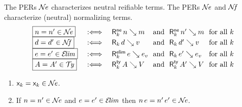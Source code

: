 \documentclass[acmlarge,review,anonymous]{acmart}\settopmatter{printfolios=true}
\begin{document}
The PERs $\mathcal{N}\!\mathit{e}$ characterizes neutral reifiable terms.
The PERs $\mathcal{N}\!\mathit{e}$ and $\mathcal{N}\!\mathit{f}$ characterize (neutral) normalizing terms.
\[
\begin{array}{l@{\quad}l@{\quad}l@{~}l@{~}l@{~}l@{~}l@{~}l}
  \fbox{$n = n' \in \NE$}
    & \defas &
    \RNe k n m &\mand& \RNe k {n'} {m} &\mforall k \\
  \fbox{$d = d' \in \NF$}
    & \defas &
    \R k d v &\mand& \R k {d'} {v} &\mforall k \\
  \fbox{$e = e' \in \ELIM$}
    & \defas &
    \RElim k e e_v &\mand& \R k {e'} {e_v} &\mforall k \\
  \fbox{$A = A' \in \TY$}
    & \defas &
    \RTy k A V &\mand& \RTy k {A'} {V} &\mforall k \\
\end{array}
\]

\begin{lemma}
  \label{lem:closne}
  \bla
  \begin{enumerate}
  \item $\mathsf{x}_{k} = \mathsf{x}_{k} \in \mathcal{N}\!\mathit{e}$.
  \item If\/ $n = n' \in \mathcal{N}\!\mathit{e}$ and $e = e' \in \mathcal{E}\!\mathit{lim}$ then $n\,e = n'\,e' \in \mathcal{N}\!\mathit{e}$.
  \end{enumerate}
\end{lemma}
\end{document}
